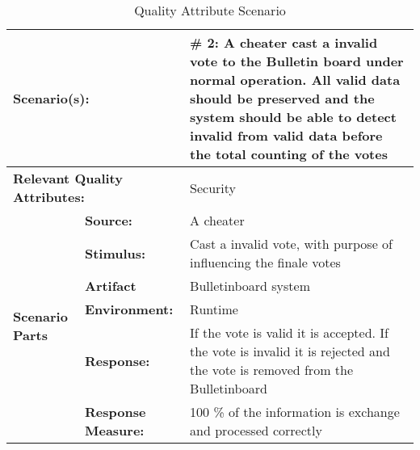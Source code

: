 \begin{table}[H]
\begin{center}
\begin{tabular}{|p{0.3cm}|p{2.5cm}|p{8cm}|}
  \hline
  \multicolumn{2}{|p{3cm}|}{\bfseries Scenario(s):} & \#  2: A cheater cast a invalid vote to the Bulletin board under normal operation. All valid data should be preserved and the system should be able to detect invalid from  valid data before the total counting of the votes\\
  \hline
  \multicolumn{2}{|p{3cm}|}{\bfseries Relevant Quality Attributes:} & Security\\
  \hline
  \multirow{6}{*}{\begin{sideways}{\bfseries Scenario Parts}\end{sideways}}
  & {\bfseries Source:} & A cheater \\
  \cline{2-3}
  & {\bfseries Stimulus:} & Cast a invalid vote, with purpose of influencing the finale votes \\
  \cline{2-3}
  & {\bfseries Artifact} &  Bulletinboard system \\
  \cline{2-3}
  & {\bfseries Environment:} &  Runtime \\
  \cline{2-3}
  & {\bfseries Response:} &  If the vote is valid it is accepted. If the vote is invalid it is rejected and the vote is removed from the Bulletinboard \\
  \cline{2-3}
  & {\bfseries Response Measure:} & 100 \% of the information is exchange and processed correctly \\
  \hline
\end{tabular}
\caption{Quality Attribute Scenario}
\end{center}
\end{table}

